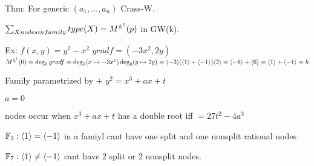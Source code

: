 Thm: For generic $(a_1,\ldots,a_n)$ Crass-W.

$\sum_{X nodes in family} type (X)= M^{\mathbb{A}^1}(p)$ in GW(k).


Ex: $f(x,y)= y^2 - x^2$
$grad f= (-3x^2,2y)$
$M^{\mathbb{A}^1}(0)= \deg_0 grad f= \deg_0 (x \mapsto -3x^1) \deg_0(y \mapsto 2y)= \langle -3 \rangle ( \langle 1 \rangle + \langle -1 \rangle) \langle 2 \rangle= \langle -6 \rangle + \langle 6 \rangle= \langle 1 \rangle + \langle -1 \rangle = h$

Family parametrized by $+$
$y^2= x^3+ax+t$

$a=0$

nodes occur when $x^3+ax+t$ has a double root iff $=27t^2-4a^3$

$\mathbb{F}_3: \langle 1 \rangle= \langle -1 \rangle$ in a famiyl cant have one split and one nonsplit rational nodes

$\mathbb{F}_7: \langle 1 \rangle \neq \langle -1 \rangle$ cant have 2 split or 2 nonsplit nodes. 


























